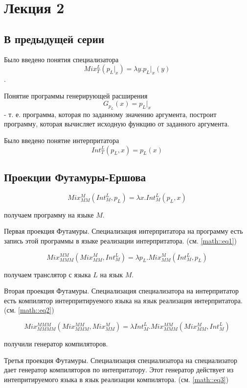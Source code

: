 \chapter{Лекция 2}

\section{В предыдущей серии}

Было введено понятия специализатора $$Mix^L_T \left(p_L |_x\right) = \lambda y . p_L |_x \left(y\right)$$.

Понятие программы генерирующей расширения $$G_{p_L}\left(x\right) = p_L |_x$$ - т. е. программа, которая по заданному значению аргумента, построит программу, которая
вычисляет исходную функцию от заданного аргумента.

Было введено понятие интерпритатора $$Int^L_T \left(p_L, x\right) = p_L\left(x\right)$$

\section{Проекции Футамуры-Ершова}

$$Mix^M_{MM} \left(Int^L_M , p_L\right) = \lambda x . Int^L_M \left(p_L, x\right)$$
\label{math::eq1}

получаем программу на языке $M$.

\begin{Def}
Первая проекция Футамуры. Специализация интерпритатора на программу есть запись этой программы в языке реализации интерпритатора. (см. \ref{math::eq1})
\end{Def}

$$Mix^{MM}_{MMM}\left(Mix^M_{MM}, Int^L_M\right) = \lambda p_L . Mix^M_{MM}\left(Int^L_M , p_L\right)$$
\label{math::eq2}

получаем транслятор с языка $L$ на язык $M$.

\begin{Def}
Вторая проекция Футамуры. Специализация специализатора на интерпритатор есть компилятор интерпритируемого языка на язык реализация интерпритатора.
(см. \ref{math::eq2})
\end{Def}

$$Mix^{MMM}_{MMMM}\left(Mix^{MM}_{MMM}, Mix^M_{MM}\right) = \lambda Int^L_M . Mix^{MM}_{MMM}\left(Mix^M_{MM}, Int^L_M\right)$$
\label{math::eq3}

получили генератор компиляторов.

\begin{Def}
Третья проекция Футамуры. Специализация специализатора на специализатор дает генератор компиляторов по интепритатору. Этот генератор действует из интепритируемого
языка в язык реализации компилятора. (см. \ref{math::eq3})
\end{Def}

